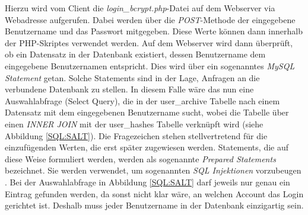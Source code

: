 \documentclass[../main.tex]{subfiles}
\begin{document}
	 Hierzu wird vom Client die \emph{login\_bcrypt.php}-Datei auf dem Webserver via Webadresse aufgerufen. Dabei werden über die \emph{POST}-Methode der eingegebene Benutzername und das Passwort mitgegeben. Diese Werte können dann innerhalb der PHP-Skriptes verwendet werden. Auf dem Webserver wird dann überprüft, ob ein Datensatz in der Datenbank existiert, dessen Benutzername dem eingegebene Benutzernamen entspricht. Dies wird über ein sogenanntes \emph{MySQL Statement} getan. Solche Statements sind in der Lage, Anfragen an die verbundene Datenbank zu stellen. In diesem Falle wäre das nun eine Auswahlabfrage (Select Query), die in der user\_archive Tabelle nach einem Datensatz mit dem eingegebenen Benutzername sucht, wobei die Tabelle über einen \emph{INNER JOIN} mit der user\_hashes Tabelle verknüpft wird (siehe Abbildung \ref{SQL:SALT}). Die Fragezeichen stehen stellvertretend für die einzufügenden Werten, die erst später zugewiesen werden. Statements, die auf diese Weise formuliert werden, werden als sogenannte \emph{Prepared Statements} bezeichnet. Sie werden verwendet, um sogenannten \emph{SQL Injektionen} vorzubeugen \cite{preparedstatement}. Bei der Auswahlabfrage in Abbildung \ref{SQL:SALT} darf jeweils nur genau ein Eintrag gefunden werden, da sonst nicht klar wäre, an welchen Account das Login gerichtet ist. Deshalb muss jeder Benutzername in der Datenbank einzigartig sein.
 
\end{document}
